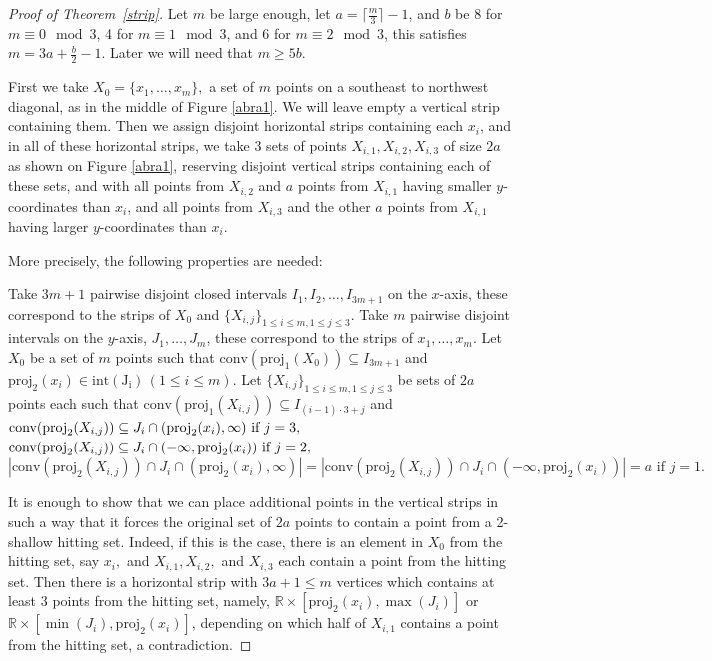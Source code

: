 \documentclass[11pt,oneside]{amsart}
\newcommand{\R}{\mathbb{R}}
\begin{document}
\begin{proof}[Proof of Theorem~\ref{strip}]
Let $m$ be large enough, let $a= \lceil \frac{m}{3} \rceil-1$, and $b$ be 8 for $m \equiv 0 \mod 3$, 4 for $m \equiv 1 \mod 3$, and 6 for $m \equiv 2 \mod 3$, this satisfies $m=3a+ \frac{b}{2}-1$. Later we will need that $m\ge 5b$.

First we take $X_0=\{x_1,\ldots,x_m\},$ a set of $m$ points on a southeast to northwest diagonal, as in the middle of Figure \ref{abra1}. We will leave empty a vertical strip containing them. Then we assign disjoint horizontal strips containing each $x_i$, and in all of these horizontal strips, we take 3 sets of points $X_{i,1},X_{i,2},X_{i,3}$ of size $2a$ as shown on Figure \ref{abra1}, reserving disjoint vertical strips containing each of these sets, and with all points from $X_{i,2}$ and $a$ points from $X_{i,1}$ having smaller $y$-coordinates than $x_i$, and all points from $X_{i,3}$ and the other $a$ points from $X_{i,1}$ having larger $y$-coordinates than $x_i$. 

More precisely, the following properties are needed:

Take $3m+1$ pairwise disjoint closed intervals $I_1,I_2,\ldots,I_{3m+1}$ on the $x$-axis, these correspond to the strips of $X_0$ and $\{X_{i,j}\}_{1\le i\le m, 1\le j\le3}$. Take $m$ pairwise disjoint intervals on the $y$-axis, $J_1,\ldots,J_m$, these correspond to the strips of $x_1,\ldots,x_m$. Let $X_0$ be a set of $m$ points such that $\mathrm{conv}(\mathrm{proj}_1(X_0))\subseteq I_{3m+1}$ and $\mathrm{proj}_2(x_i)\in\mathrm{int(J_i)} \, (1\le i\le m).$ Let $\{X_{i,j}\}_{1\le i\le m, 1\le j\le3}$ be sets of $2a$ points each such that $\mathrm{conv}(\mathrm{proj}_1(X_{i,j}))\subseteq I_{(i-1)\cdot3+j}$ and \\
$\text{conv}(\text{proj}_2(X_{i,j}))\subseteq J_i\cap (\text{proj}_2(x_i),\infty)\hfill\text{ if } j=3,$\\
$\text{conv}(\text{proj}_2(X_{i,j}))\subseteq J_i\cap (-\infty,\text{proj}_2(x_i))\hfill\text{ if } j=2,$\\
$|\text{conv}(\text{proj}_2(X_{i,j}))\cap J_i\cap (\text{proj}_2(x_i),\infty)|=|\text{conv}(\text{proj}_2(X_{i,j}))\cap J_i\cap (-\infty,\text{proj}_2(x_i))|=a\text{ if } j=1.$


It is enough to show that we can place additional points in the vertical strips in such a way that it forces the original set of $2a$ points to contain a point from a 2-shallow hitting set. Indeed, if this is the case, there is an element in $X_0$ from the hitting set, say $x_i,$ and $X_{i,1},X_{i,2},$ and $X_{i,3}$ each contain a point from the hitting set. Then there is a horizontal strip with $3a+1\le m$ vertices which contains at least 3 points from the hitting set, namely, $\R\times[\text{proj}_2(x_i),\max(J_i)]$ or $\R\times[\min(J_i),\text{proj}_2(x_i)]$, depending on which half of $X_{i,1}$ contains a point from the hitting set, a contradiction.


\end{proof}
\end{document}
